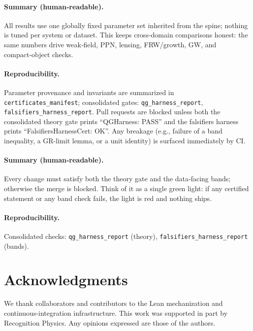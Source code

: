 \documentclass[aps,prd,twocolumn,superscriptaddress,nofootinbib,floatfix,longbibliography]{revtex4-2}
\begin{document}
\paragraph*{Summary (human‑readable).}
All results use one globally fixed parameter set inherited from the spine; nothing is tuned per system or dataset. This keeps cross‑domain comparisons honest: the same numbers drive weak‑field, PPN, lensing, FRW/growth, GW, and compact‑object checks.
\paragraph*{Reproducibility.}
Parameter provenance and invariants are summarized in \texttt{certificates\_manifest}; consolidated gates: \texttt{qg\_harness\_report}, \texttt{falsifiers\_harness\_report}. 
%
Pull requests are blocked unless both the consolidated theory gate prints ``QGHarness: PASS'' and the falsifiers harness prints ``FalsifiersHarnessCert: OK''. Any breakage (e.g., failure of a band inequality, a GR-limit lemma, or a unit identity) is surfaced immediately by CI.
%
\paragraph*{Summary (human‑readable).}
Every change must satisfy both the theory gate and the data‑facing bands; otherwise the merge is blocked. Think of it as a single green light: if any certified statement or any band check fails, the light is red and nothing ships.
\paragraph*{Reproducibility.}
Consolidated checks: \texttt{qg\_harness\_report} (theory), \texttt{falsifiers\_harness\_report} (bands). 
%
%
\section*{Acknowledgments}
We thank collaborators and contributors to the Lean mechanization and continuous-integration infrastructure. This work was supported in part by Recognition Physics. Any opinions expressed are those of the authors.
%
\end{document}

